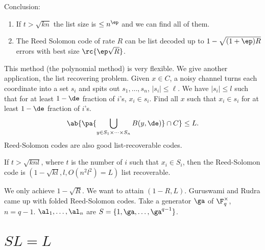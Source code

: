 Conclusion: 
\begin{enumerate}
\item
If $t>\sqrt{kn}$ the list size is $\le n^\ep$ and we can find all of them.
\item
The Reed Solomon code of rate $R$ can be list decoded up to $1-\sqrt{(1+\ep)R}$ errors with best size $\rc{\ep\sqrt R}$.
\end{enumerate}

This method (the polynomial method) is very flexible. We give another application, the list recovering problem. Given $x\in C$, 
a noisy channel turns each coordinate into a set $s_i$ and spits out $s_1,\ldots, s_n$, $|s_i|\le \ell$. We have $|s_i|\le l $ such that for at least $1-\de$ fraction of $i$'s, $x_i\in s_i$. Find all $x$ such that $x_i\in s_i$ for at least $1-\de$ fraction of $i$'s. 
\[
\ab{
\pa{
\bigcup_{y\in S_1\times \cdots \times S_n} B(y,\de)
}\cap C
}\le L.
\]
Reed-Solomon codes are also good list-recoverable codes.

If $t>\sqrt{knl}$, where $t$ is the number of $i$ such that $x_i\in S_i$, then the Reed-Solomon code is $(1-\sqrt{kl},l,O(n^2l^2)=L)$ list recoverable.

We only achieve $1-\sqrt R$. We want to attain $(1-R,L)$. Guruswami and Rudra came up with folded Reed-Solomon codes. 
Take a generator $\ga $ of $\F_q^{\times}$, $n=q-1$. $\al_1,\ldots, \al_n$ are $S=\{1,\ga,\ldots, \ga^{q-1}\}$. 





\section{$SL=L$}

